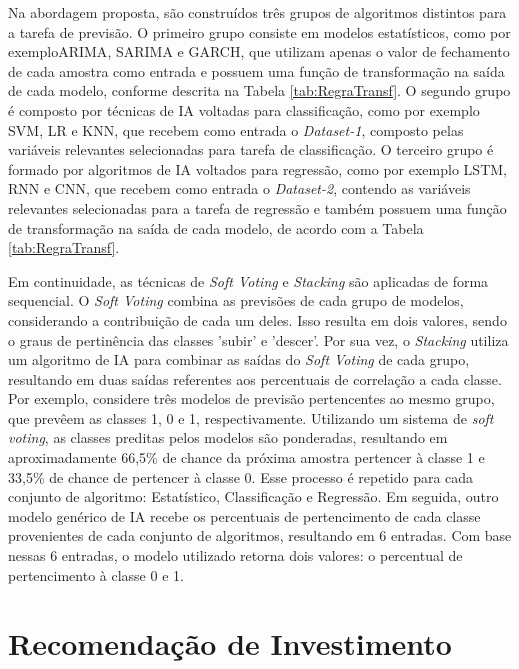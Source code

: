 Na abordagem proposta, são construídos três grupos de algoritmos distintos para a tarefa de previsão. O primeiro grupo consiste em modelos estatísticos, como por exemplo\ac{ARIMA}, \ac{SARIMA} e \ac{GARCH}, que utilizam apenas o valor de fechamento de cada amostra como entrada e possuem uma função de transformação na saída de cada modelo, conforme descrita na Tabela \ref{tab:RegraTransf}. O segundo grupo é composto por técnicas de \ac{IA} voltadas para classificação, como por exemplo \ac{SVM}, \ac{LR} e \ac{KNN}, que recebem como entrada o \textit{Dataset-1}, composto pelas variáveis relevantes selecionadas para tarefa de classificação. O terceiro grupo é formado por algoritmos de \ac{IA} voltados para regressão, como por exemplo \ac{LSTM}, \ac{RNN} e \ac{CNN}, que recebem como entrada o \textit{Dataset-2}, contendo as variáveis relevantes selecionadas para a tarefa de regressão e também possuem uma função de transformação na saída de cada modelo, de acordo com a Tabela \ref{tab:RegraTransf}. 

Em continuidade, as técnicas de \textit{Soft Voting} e \textit{Stacking} são aplicadas de forma sequencial. O \textit{Soft Voting} combina as previsões de cada grupo de modelos, considerando a contribuição de cada um deles. Isso resulta em dois valores, sendo o graus de pertinência das classes 'subir' e 'descer'. Por sua vez, o \textit{Stacking} utiliza um algoritmo de \ac{IA} para combinar as saídas do \textit{Soft Voting} de cada grupo, resultando em duas saídas referentes aos percentuais de correlação a cada classe. 
Por exemplo, considere três modelos de previsão pertencentes ao mesmo grupo, que prevêem as classes 1, 0 e 1, respectivamente. Utilizando um sistema de \textit{soft voting}, as classes preditas pelos modelos são ponderadas, resultando em aproximadamente 66,5\% de chance da próxima amostra pertencer à classe 1 e 33,5\% de chance de pertencer à classe 0. Esse processo é repetido para cada conjunto de algoritmo: Estatístico, Classificação e Regressão. Em seguida, outro modelo genérico de IA recebe os percentuais de pertencimento de cada classe provenientes de cada conjunto de algoritmos, resultando em 6 entradas. Com base nessas 6 entradas, o modelo utilizado retorna dois valores: o percentual de pertencimento à classe 0 e 1.

\section{Recomendação de Investimento}
\label{sec:estrategia}

